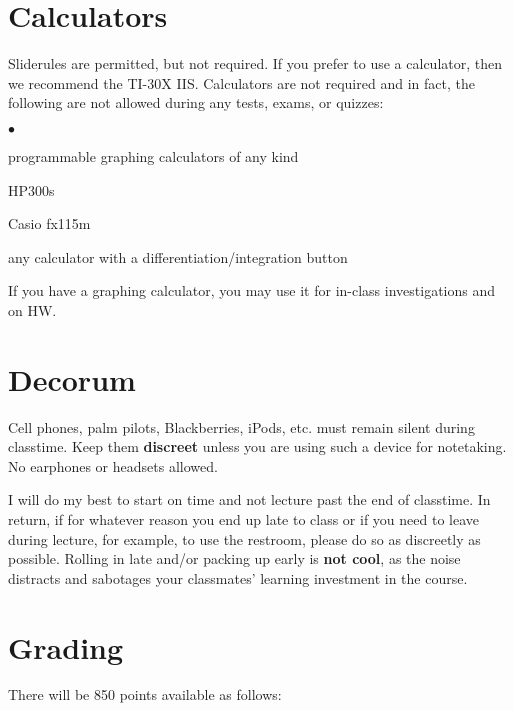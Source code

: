 \documentclass[margin,line,pifont,palatino,courier]{res}
\newenvironment{list2}{
  \begin{list}{$\bullet$}{%
      \setlength{\itemsep}{0in}
      \setlength{\parsep}{0in} \setlength{\parskip}{0in}
      \setlength{\topsep}{0in} \setlength{\partopsep}{0in}
      \setlength{\leftmargin}{0.2in}}}{\end{list}}
\begin{document}
\begin{resume}
\section{\sc Calculators} Sliderules are permitted, but not required.  If you prefer to use a calculator, then we recommend the TI-30X IIS.  Calculators are not required and in fact, the following are not allowed during any tests, exams, or quizzes:
\begin{list2} 
\item programmable graphing calculators of any kind
\item HP300s 
\item Casio fx115m 
\item any calculator with a differentiation/integration button 
\end{list2} 
\vspace{-0.1in}
If you have a graphing calculator, you may use it for in-class investigations and on HW.

\section{\sc Decorum} Cell phones, palm pilots, Blackberries, iPods, etc. must remain silent during classtime.  Keep them \textbf{discreet} unless you are using such a device for notetaking.  No earphones or headsets allowed.

\vspace{-0.1in}
I will do my best to start on time and not lecture past the end of classtime.  In return, if for whatever reason you end up late to class or if you need to leave during lecture, for example, to use the restroom, please do so as discreetly as possible.  Rolling in late and/or packing up early is \textbf{not cool}, as the noise distracts and sabotages your classmates' learning investment in the course.  

\section{\sc Grading} There will be 850 points available as follows:


\end{resume}
\end{document}
